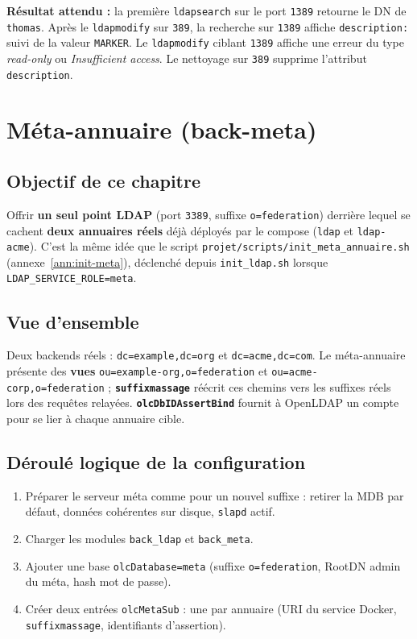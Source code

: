 \documentclass[11pt,a4paper]{report}
\begin{document}
\textbf{Résultat attendu :} la première \texttt{ldapsearch} sur le port \texttt{1389} retourne le DN de \texttt{thomas}. Après le \texttt{ldapmodify} sur \texttt{389}, la recherche sur \texttt{1389} affiche \texttt{description:} suivi de la valeur \texttt{MARKER}. Le \texttt{ldapmodify} ciblant \texttt{1389} affiche une erreur du type \emph{read-only} ou \emph{Insufficient access}. Le nettoyage sur \texttt{389} supprime l'attribut \texttt{description}.

\chapter{Méta-annuaire (back-meta)}

\section{Objectif de ce chapitre}

Offrir \textbf{un seul point LDAP} (port \texttt{3389}, suffixe \texttt{o=federation}) derrière lequel se cachent \textbf{deux annuaires réels} déjà déployés par le compose (\texttt{ldap} et \texttt{ldap-acme}). C'est la même idée que le script \texttt{projet/scripts/init\_meta\_annuaire.sh} (annexe~\ref{ann:init-meta}), déclenché depuis \texttt{init\_ldap.sh} lorsque \texttt{LDAP\_SERVICE\_ROLE=meta}.

\section{Vue d'ensemble}

Deux backends réels : \texttt{dc=example,dc=org} et \texttt{dc=acme,dc=com}. Le méta-annuaire présente des \textbf{vues} \texttt{ou=example-org,o=federation} et \texttt{ou=acme-corp,o=federation} ; \textbf{\texttt{suffixmassage}} réécrit ces chemins vers les suffixes réels lors des requêtes relayées. \textbf{\texttt{olcDbIDAssertBind}} fournit à OpenLDAP un compte pour se lier à chaque annuaire cible.

\section{Déroulé logique de la configuration}

\begin{enumerate}[leftmargin=*]
  \item Préparer le serveur méta comme pour un nouvel suffixe : retirer la MDB par défaut, données cohérentes sur disque, \texttt{slapd} actif.
  \item Charger les modules \texttt{back\_ldap} et \texttt{back\_meta}.
  \item Ajouter une base \texttt{olcDatabase=meta} (suffixe \texttt{o=federation}, RootDN admin du méta, hash mot de passe).
  \item Créer deux entrées \texttt{olcMetaSub} : une par annuaire (URI du service Docker, \texttt{suffixmassage}, identifiants d'assertion).
\end{enumerate}
\end{document}
